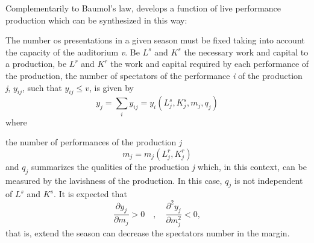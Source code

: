 \documentclass[a4paper, 12pt, openright, oneside, german, french, brazil, english, article]{abntex2}
\begin{document}
	Complementarily to Baumol's law,  develops a function of live performance production which can be synthesized in this way:
	
	
	The number os presentations in a given season must be fixed taking into account the capacity of the auditorium \textit{v}. Be $L^s$ and $K^s$ the necessary work and capital to a production, be $L^r$ and $K^r$ the work and capital required by each performance of the production, the number of spectators of the performance \textit{i} of the production \textit{j}, $y_{ij}$, such that $y_{ij} \leq v$, is given by
	$$y_j = \sum_iy_{ij} = y_i(L^{s}_{j}, K^{s}_{j}, m_j, q_j) $$ where
	
	the number of performances of the production \textit{j} $$m_j = m_j(L^{r}_{j}, K^{r}_{j})$$ and $q_j$ summarizes the qualities of the production \textit{j} which, in this context, can be measured by the lavishness of the production. In this case, $q_j$ is not independent of $L^s$ and $K^s$. It is expected that $$\frac{\partial y_j}{\partial m_j} > 0 \quad, \quad \frac{\partial^2y_j}{\partial m^{2}_{j}} < 0,$$ that is, extend the season can decrease the spectators number in the margin.
	
\end{document}

